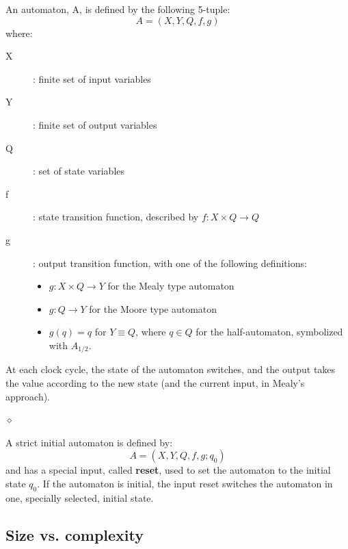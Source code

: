 \begin{definition}
An automaton, A, is defined by the following 5-tuple:
$$A=(X, Y, Q, f, g)$$
where:
\begin{description}
\item[X]: finite set of input variables \item[Y]: finite
set of output variables \item[Q]: set of state variables
\item[f]: state transition function, described by $f:X \times
Q \rightarrow Q$ \item[g]: output transition function,  with
one of the  following  definitions:
\begin{itemize}
    \item $g:X \times Q \rightarrow Y$ for the Mealy type automaton
    \item $g:Q \rightarrow Y$ for the Moore type automaton
    \item $g(q)=q$ for $Y \equiv Q$, where $q \in Q$ for the half-automaton, symbolized with $A_{1/2}$.
\end{itemize}
\end{description}
At each clock cycle, the state of the automaton  switches, and the
output takes the value according to the new state (and the current
input, in Mealy's approach).

$\diamond$
\end{definition}

A strict initial automaton is defined by:
$$A=(X, Y, Q, f, g; q_{0})$$
and has a special input, called {\bf reset}, used to set the
automaton to the initial state $q_{0}$. If the automaton is
initial, the input reset switches the automaton in one,
specially selected, initial state.

\subsection{Size vs. complexity}

